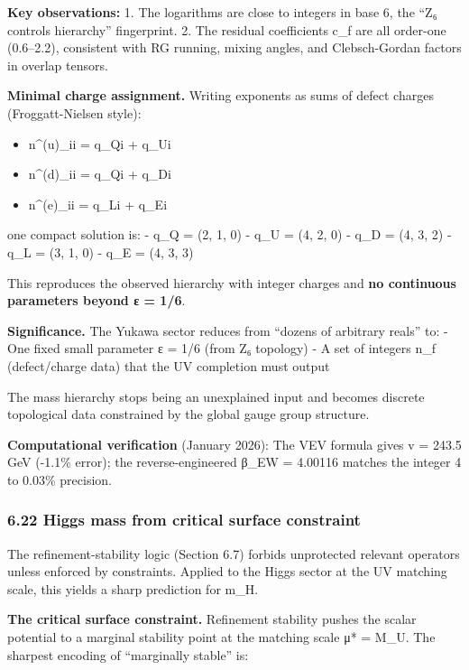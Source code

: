 \documentclass[
]{article}
\providecommand{\tightlist}{%
  \setlength{\itemsep}{0pt}\setlength{\parskip}{0pt}}
\begin{document}
\textbf{Key observations:} 1. The logarithms are close to integers in
base 6, the ``Z₆ controls hierarchy'' fingerprint. 2. The residual
coefficients c\_f are all order-one (0.6--2.2), consistent with RG
running, mixing angles, and Clebsch-Gordan factors in overlap tensors.

\textbf{Minimal charge assignment.} Writing exponents as sums of defect
charges (Froggatt-Nielsen style):

\begin{itemize}
\tightlist
\item
  n\^{}(u)\_ii = q\_Qi + q\_Ui
\item
  n\^{}(d)\_ii = q\_Qi + q\_Di
\item
  n\^{}(e)\_ii = q\_Li + q\_Ei
\end{itemize}

one compact solution is: - q\_Q = (2, 1, 0) - q\_U = (4, 2, 0) - q\_D =
(4, 3, 2) - q\_L = (3, 1, 0) - q\_E = (4, 3, 3)

This reproduces the observed hierarchy with integer charges and
\textbf{no continuous parameters beyond ε = 1/6}.

\textbf{Significance.} The Yukawa sector reduces from ``dozens of
arbitrary reals'' to: - One fixed small parameter ε = 1/6 (from Z₆
topology) - A set of integers n\_f (defect/charge data) that the UV
completion must output

The mass hierarchy stops being an unexplained input and becomes discrete
topological data constrained by the global gauge group structure.

\textbf{Computational verification} (January 2026): The VEV formula
gives v = 243.5 GeV (-1.1\% error); the reverse-engineered β\_EW =
4.00116 matches the integer 4 to 0.03\% precision.

\subsubsection{6.22 Higgs mass from critical surface
constraint}\label{higgs-mass-from-critical-surface-constraint}

The refinement-stability logic (Section 6.7) forbids unprotected
relevant operators unless enforced by constraints. Applied to the Higgs
sector at the UV matching scale, this yields a sharp prediction for
m\_H.

\textbf{The critical surface constraint.} Refinement stability pushes
the scalar potential to a marginal stability point at the matching scale
μ* = M\_U. The sharpest encoding of ``marginally stable'' is:
\end{document}
